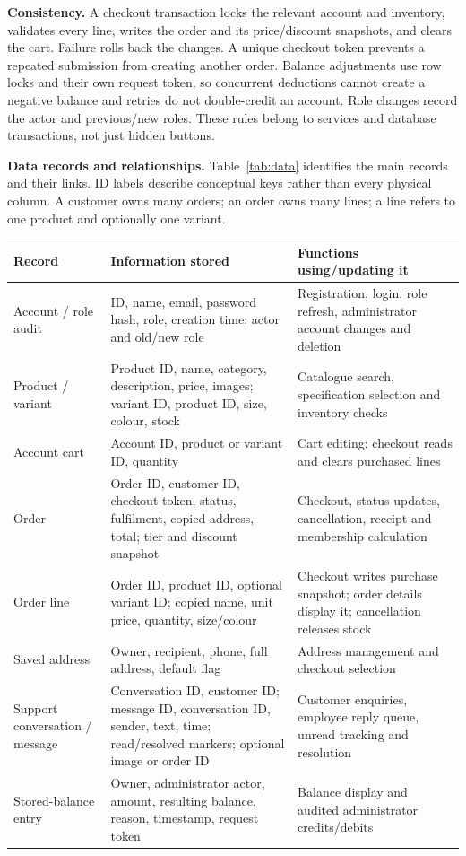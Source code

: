 \documentclass[11pt,a4paper]{article}
\begin{document}
\textbf{Consistency.} A checkout transaction locks the relevant account and inventory, validates every line, writes the order and its price/discount snapshots, and clears the cart. Failure rolls back the changes. A unique checkout token prevents a repeated submission from creating another order. Balance adjustments use row locks and their own request token, so concurrent deductions cannot create a negative balance and retries do not double-credit an account. Role changes record the actor and previous/new roles. These rules belong to services and database transactions, not just hidden buttons.

\newpage
\textbf{Data records and relationships.} Table~\ref{tab:data} identifies the main records and their links. ID labels describe conceptual keys rather than every physical column. A customer owns many orders; an order owns many lines; a line refers to one product and optionally one variant.
\begin{center}
\small
\begin{tabularx}{\linewidth}{|p{27mm}|Y|Y|}\hline
\textbf{Record}&\textbf{Information stored}&\textbf{Functions using/updating it}\\\hline
Account / role audit&ID, name, email, password hash, role, creation time; actor and old/new role&Registration, login, role refresh, administrator account changes and deletion\\\hline
Product / variant&Product ID, name, category, description, price, images; variant ID, product ID, size, colour, stock&Catalogue search, specification selection and inventory checks\\\hline
Account cart&Account ID, product or variant ID, quantity&Cart editing; checkout reads and clears purchased lines\\\hline
Order&Order ID, customer ID, checkout token, status, fulfilment, copied address, total; tier and discount snapshot&Checkout, status updates, cancellation, receipt and membership calculation\\\hline
Order line&Order ID, product ID, optional variant ID; copied name, unit price, quantity, size/colour&Checkout writes purchase snapshot; order details display it; cancellation releases stock\\\hline
Saved address&Owner, recipient, phone, full address, default flag&Address management and checkout selection\\\hline
Support conversation / message&Conversation ID, customer ID; message ID, conversation ID, sender, text, time; read/resolved markers; optional image or order ID&Customer enquiries, employee reply queue, unread tracking and resolution\\\hline
Stored-balance entry&Owner, administrator actor, amount, resulting balance, reason, timestamp, request token&Balance display and audited administrator credits/debits\\\hline
\end{tabularx}
\label{tab:data}
\end{center}
\end{document}
